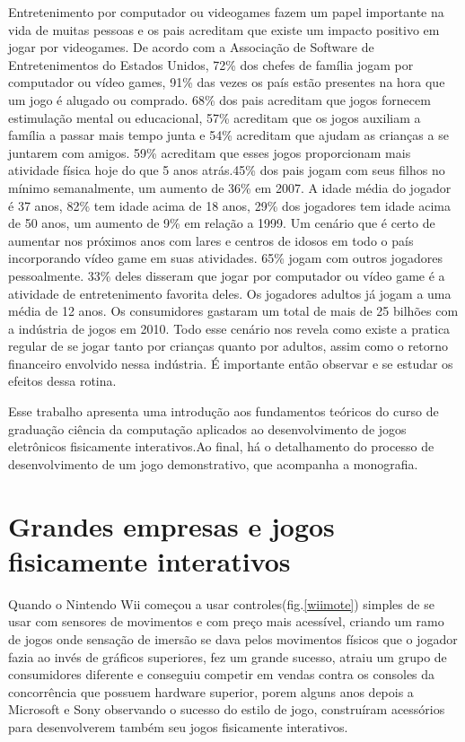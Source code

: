 Entretenimento por computador ou videogames fazem um papel importante na vida de muitas pessoas e os pais acreditam que existe um impacto positivo em jogar por videogames.
De acordo com a Associação de Software de Entretenimentos do Estados Unidos\cite{ESA}, 72\% dos chefes de família jogam por computador ou vídeo games,
91\% das vezes os país estão presentes na hora que um jogo é alugado ou comprado. 68\% dos pais acreditam que jogos fornecem estimulação mental ou educacional,
57\% acreditam que os jogos auxiliam a família a passar mais tempo junta e 54\% acreditam que ajudam as crianças a se juntarem com amigos. 59\% acreditam que esses
jogos proporcionam mais atividade física hoje do que 5 anos atrás.45\% dos pais jogam com seus filhos no mínimo semanalmente, um aumento de 36\% em 2007.
A idade média do jogador é 37 anos, 82\% tem idade acima de 18 anos, 29\% dos jogadores tem idade acima de 50 anos, um aumento de 9\% em relação a 1999.
Um cenário que é certo de aumentar nos próximos anos com lares e centros de idosos em todo o país incorporando vídeo game em suas atividades.
65\% jogam com outros jogadores pessoalmente. 33\% deles disseram que jogar por computador ou vídeo game é a atividade de entretenimento favorita deles.
Os jogadores adultos já jogam a uma média de 12 anos. Os consumidores gastaram um total de mais de 25 bilhões com a indústria de jogos em 2010.
Todo esse cenário nos revela como existe a pratica regular de se jogar tanto por crianças quanto por adultos, assim como o retorno financeiro envolvido nessa
indústria. É importante então observar e se estudar os efeitos dessa rotina.

Esse trabalho apresenta uma introdução aos fundamentos teóricos do curso de graduação ciência da computação aplicados ao desenvolvimento de jogos eletrônicos
fisicamente interativos.Ao final, há o detalhamento do processo de desenvolvimento de um jogo demonstrativo, que acompanha a monografia.

\section{Grandes empresas e jogos fisicamente interativos}

Quando o Nintendo Wii começou a usar controles(fig.\ref{wiimote}) simples de se usar com sensores de movimentos e com preço mais acessível, criando um ramo de jogos onde sensação
de imersão se dava pelos movimentos físicos que o jogador fazia ao invés de gráficos superiores, fez um grande sucesso, atraiu um grupo de consumidores diferente
e conseguiu competir em vendas contra os consoles  da concorrência que possuem hardware superior, porem alguns anos depois a Microsoft e Sony observando o sucesso
do estilo de jogo, construíram acessórios para desenvolverem também seu jogos fisicamente interativos.

